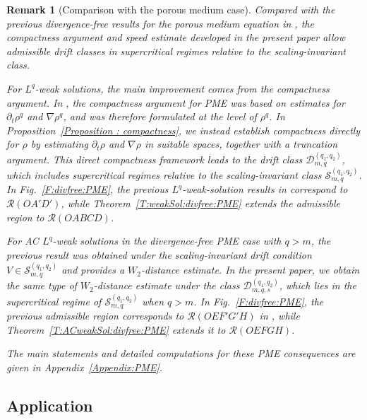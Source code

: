 \documentclass{amsart}
\newtheorem{remark}[defn]{Remark}
\numberwithin{equation}{section}
\begin{document}
\begin{remark}[Comparison with the porous medium case]\label{R:PME}
Compared with the previous divergence-free results for the porous medium equation in \cite{HKK02}, the compactness argument and speed estimate developed in the present paper allow admissible drift classes in supercritical regimes relative to the scaling-invariant class.

For $L^q$-weak solutions, the main improvement comes from the compactness argument. In \cite[Proposition~4.19]{HKK01}, the compactness argument for PME was based on estimates for $\partial_t \rho^q$ and $\nabla \rho^q$, and was therefore formulated at the level of $\rho^q$. In Proposition~\ref{Proposition : compactness}, we instead establish compactness directly for $\rho$ by estimating $\partial_t\rho$ and $\nabla\rho$ in suitable spaces, together with a truncation argument. This direct compactness framework leads to the drift class $\mathcal{D}_{m,q}^{(q_1,q_2)}$, which includes supercritical regimes relative to the scaling-invariant class $\mathcal{S}_{m,q}^{(q_1,q_2)}$. In Fig.~\ref{F:divfree:PME}, the previous $L^q$-weak-solution results in \cite[Theorems~2.8 and 2.10]{HKK02} correspond to $\mathcal{R}(OA'D')$, while Theorem~\ref{T:weakSol:divfree:PME} extends the admissible region to $\mathcal{R}(OABCD)$.

For AC $L^q$-weak solutions in the divergence-free PME case with $q>m$, the previous result \cite[Theorem~2.12]{HKK02} was obtained under the scaling-invariant drift condition $V\in\mathcal{S}_{m,q}^{(q_1,q_2)}$ and provides a $W_2$-distance estimate. In the present paper, we obtain the same type of $W_2$-distance estimate under the class $\mathcal{D}_{m,q,s}^{(q_1,q_2)}$, which lies in the supercritical regime of $\mathcal{S}_{m,q}^{(q_1,q_2)}$ when $q>m$. In Fig.~\ref{F:divfree:PME}, the previous admissible region corresponds to $\mathcal{R}(OEF'G'H)$ in \cite[Theorem~2.12]{HKK02}, while Theorem~\ref{T:ACweakSol:divfree:PME} extends it to $\mathcal{R}(OEFGH)$.

The main statements and detailed computations for these PME consequences are given in Appendix~\ref{Appendix:PME}.
\end{remark}





\subsection{Application}
\end{document}
